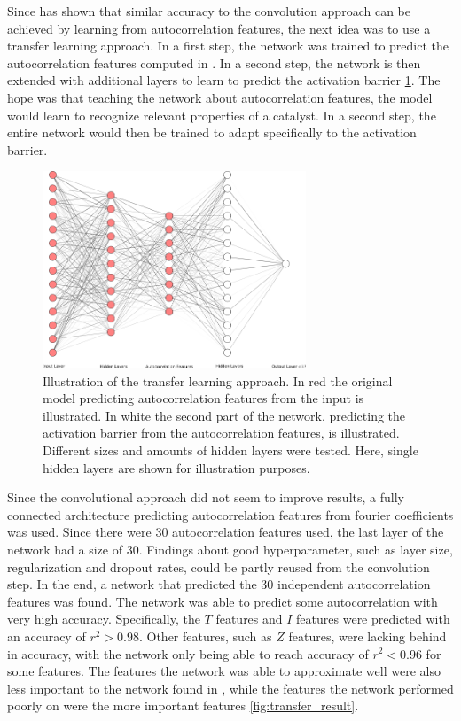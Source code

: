 Since \cite{friederich_dos} has shown that similar accuracy to the convolution approach can be achieved by learning from autocorrelation features,
the next idea was to use a transfer learning approach.
In a first step, the network was trained to predict the autocorrelation features computed in \cite{friederich_dos}.
In a second step, the network is then extended with additional layers to learn to predict the activation barrier \ref{fig:transferlearn}.
The hope was that teaching the network about autocorrelation features, the model would learn to recognize relevant properties of a catalyst.
In a second step, the entire network would then be trained to adapt specifically to the activation barrier.

\begin{figure} [h]
    \centering
    \includegraphics[width=0.7\textwidth]{figures/regression/fourier/nn.png} 
    \caption[Transfer learning model]{Illustration of the transfer learning approach.
        In red the original model predicting autocorrelation features from the input is illustrated.
        In white the second part of the network, predicting the activation barrier from the autocorrelation features, is illustrated.
        Different sizes and amounts of hidden layers were tested. Here, single hidden layers are shown for illustration purposes.
    }
    \label{fig:transferlearn}
\end{figure}

Since the convolutional approach did not seem to improve results, a fully connected architecture predicting autocorrelation features from fourier coefficients 
was used.
Since there were 30 autocorrelation features used, the last layer of the network had a size of 30.
Findings about good hyperparameter, such as layer size, regularization and dropout rates, could be partly reused from the convolution step.
In the end, a network that predicted the 30 independent autocorrelation features was found.
The network was able to predict some autocorrelation with very high accuracy. Specifically, the $T$ features and $I$ features were
predicted with an accuracy of $r^2 > 0.98$. 
Other features, such as $Z$ features, were lacking behind in accuracy, with the network only being able to reach accuracy of $r^2<0.96$ for some features.
The features the network was able to approximate well were also less important to the network found in \cite{friederich_dos}, while the features 
the network performed poorly on were the more important features \ref{fig:transfer_result}.

